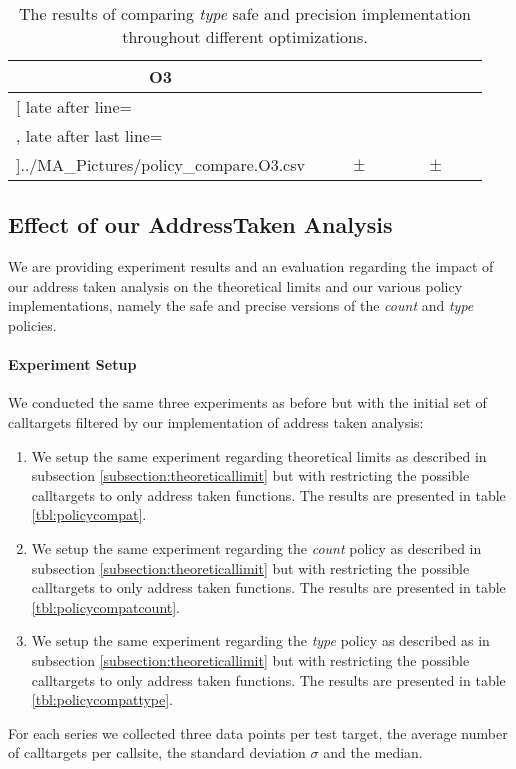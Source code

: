 \begin{table}[!htbp]
{\begin{tabular}{l|c|rcl|c|rcl|c}
\multicolumn{1}{c}{\bfseries O3}
	\\\midrule
	\csvreader[ late after line=\\, late after last line=\\\bottomrule]{../MA_Pictures/policy_compare.O3.csv}{
}
	{\csvcolii  &  \csvcoliii & \csvcolxiii & $\pm$ & \csvcolxiv & \csvcolxv & \csvcolxvi & $\pm$ & \csvcolxvii& \csvcolxviii}%

    	\end{tabular}
}
		\caption {The results of comparing \textit{type} safe and precision implementation throughout different optimizations.}
		\label{tbl:policycomptype}
\end{table}

\newpage


\subsection{Effect of our AddressTaken Analysis}
\label{subsection:effectivenessaddresstaken}
We are providing experiment results and an evaluation regarding the impact of our address taken analysis on the theoretical limits and our various policy implementations, namely the safe and precise versions of the \textit{count} and \textit{type} policies.
\paragraph{Experiment Setup} We conducted the same three experiments as before but with the initial set of calltargets filtered by our implementation of address taken analysis:
\begin{enumerate}
\item We setup the same experiment regarding theoretical limits as described in subsection \ref{subsection:theoreticallimit} but with restricting the possible calltargets to only address taken functions. The results are presented in table \ref{tbl:policycompat}.
\item We setup the same experiment regarding the \textit{count} policy as described in subsection \ref{subsection:theoreticallimit} but with restricting the possible calltargets to only address taken functions. The results are presented in table \ref{tbl:policycompatcount}.
\item We setup the same experiment regarding the \textit{type} policy as described as in subsection \ref{subsection:theoreticallimit} but with restricting the possible calltargets to only address taken functions. The results are presented in table \ref{tbl:policycompattype}.
\end{enumerate}
For each series we collected three data points per test target, the average number of calltargets per callsite, the standard deviation $\sigma$ and the median.

